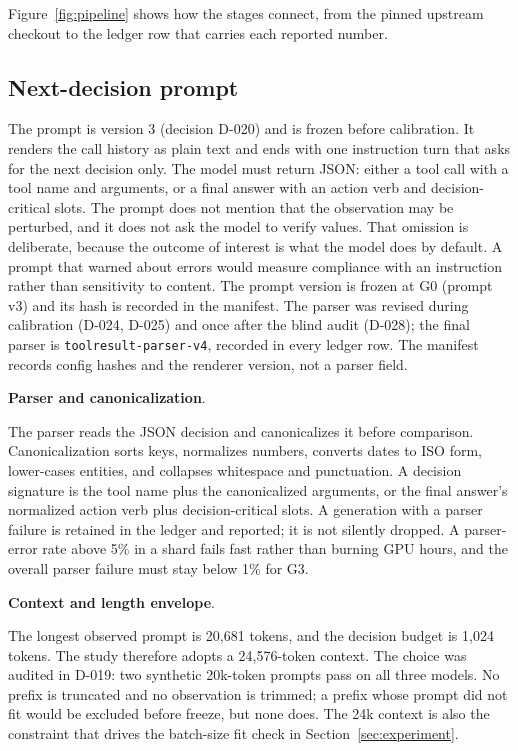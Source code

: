 \documentclass[a4paper,fleqn]{cas-sc}
\begin{document}
Figure~\ref{fig:pipeline} shows how the stages connect, from the pinned upstream checkout to the
ledger row that carries each reported number.

\subsection{Next-decision prompt}



The prompt is version 3 (decision D-020) and is frozen before calibration. It renders the call
history as plain text and ends with one instruction turn that asks for the next decision only. The model must
return JSON: either a tool call with a tool name and arguments, or a final answer with an action
verb and decision-critical slots. The prompt does not mention that the observation may be
perturbed, and it does not ask the model to verify values. That omission is deliberate, because
the outcome of interest is what the model does by default. A prompt that warned about errors
would measure compliance with an instruction rather than sensitivity to content. The prompt
version is frozen at G0 (prompt v3) and its hash is recorded in the manifest. The parser was
revised during calibration (D-024, D-025) and once after the blind audit (D-028); the final
parser is \texttt{toolresult-parser-v4}, recorded in every ledger row. The manifest records
config hashes and the renderer version, not a parser field.

\noindent\textbf{Parser and canonicalization}.\

The parser reads the JSON decision and canonicalizes it before comparison. Canonicalization sorts
keys, normalizes numbers, converts dates to ISO form, lower-cases entities, and collapses
whitespace and punctuation. A decision signature is the tool name plus the canonicalized
arguments, or the final answer's normalized action verb plus decision-critical slots. A
generation with a parser failure is retained in the ledger and reported; it is not silently
dropped. A parser-error rate above 5\% in a shard fails fast rather than burning GPU hours, and
the overall parser failure must stay below 1\% for G3.

\noindent\textbf{Context and length envelope}.\

The longest observed prompt is 20{,}681 tokens, and the decision budget is 1{,}024 tokens. The
study therefore adopts a 24{,}576-token context. The choice was audited in D-019: two synthetic
20k-token prompts pass on all three models. No prefix is truncated and no observation is
trimmed; a prefix whose prompt did not fit would be excluded before freeze, but none does. The
24k context is also the constraint that drives the batch-size fit check in
Section~\ref{sec:experiment}.
\end{document}
